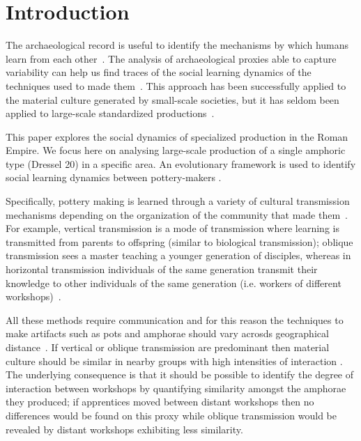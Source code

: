 \documentclass[review]{elsarticle}
\begin{document}
\linenumbers

\section{Introduction}

The archaeological record is useful to identify the mechanisms by which humans learn from each other~\citep{richerson2005not,eerkens_jelmer_cultural_2007}. The analysis of archaeological proxies able to capture variability can help us find traces of the social learning dynamics of the techniques used to made them~\citep{shennan_ceramic_2001,eerkens_jelmer_cultural_2005, gandon_copying_2014}. This approach has been successfully applied to the material culture generated by small-scale societies, but it has seldom been applied to large-scale standardized productions~\citep{shennan_isolation-by-distance_2015}.

This paper explores the social dynamics of specialized production in the Roman Empire. We focus here on analysing large-scale production of a single amphoric type (Dressel 20) in a specific area. An evolutionary framework is used to identify social learning dynamics between pottery-makers \citep{shennan_evolution_2008,mesoudi_cultural_2015}. 

Specifically, pottery making is learned through a variety of cultural transmission mechanisms depending on the organization of the community that made them~\citep{neff1992ceramics,shennan_genes_2002,bowser_learning_2008,hosfield_modes_2009}. For example, vertical transmission is a mode of transmission where learning is transmitted from parents to offspring (similar to biological transmission); oblique transmission sees a master teaching a younger generation of disciples, whereas in horizontal transmission individuals of the same generation transmit their knowledge to other individuals of the same generation (i.e. workers of different workshops)~\citep{cavalli-sforza_cultural_1981, acerbi_cultural_2006}.

All these methods require communication and for this reason the techniques to make artifacts such as pots and amphorae should vary acrosds geographical distance~\citep{bjorklund_effect_2010,shennan_isolation-by-distance_2015, van_strien_isolation-by-distance_2015}. If vertical or oblique transmission are predominant then material culture should be similar in nearby groups with high intensities of interaction \citep{hart_effects_2012}. The underlying consequence is that it should be possible to identify the degree of interaction between workshops by quantifying similarity amongst the amphorae they produced; if apprentices moved between distant workshops then no differences would be found on this proxy while oblique transmission would be revealed by distant workshops exhibiting less similarity.
\end{document}
